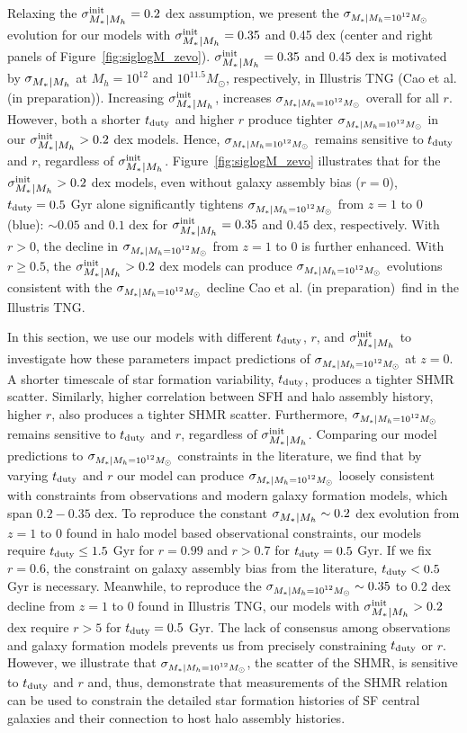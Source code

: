 \documentclass[12pt, letterpaper, preprint, tighten]{aastex62}
\newcommand{\cao}{Cao et al. (in preparation)}
\newcommand{\tduty}{t_{\rm duty}}
\newcommand{\siglogm}{\sigma_{\scaleto{M_*|M_h}{8pt}}}
\newcommand{\sigtwe}{\sigma_{\scaleto{M_*|M_h=10^{12}M_\odot}{8pt}}}
\begin{document}
Relaxing the $\siglogm^{\rm init} = 0.2$ dex assumption, we present the 
$\sigtwe$ evolution for our models with $\siglogm^{\rm init} = 0.35$
and 0.45 dex (center and right panels of Figure~\ref{fig:siglogM_zevo}).  
$\siglogm^{\rm init} = 0.35$ and 0.45 dex is motivated by $\siglogm$ at 
$M_h = 10^{12}$ and $10^{11.5}M_\odot$, respectively, in Illustris TNG (\cao). 
Increasing $\siglogm^{\rm init}$, increases $\sigtwe$ overall for all $r$. 
However, both a shorter $t_{\rm duty}$ and higher $r$ produce tighter 
$\sigtwe$ in our $\siglogm^{\rm init} > 0.2$ dex models. Hence, $\sigtwe$ 
remains sensitive to $t_{\rm duty}$ and $r$, regardless of $\siglogm^{\rm init}$. 
Figure~\ref{fig:siglogM_zevo} illustrates that for the $\siglogm^{\rm init}> 0.2$ dex 
models, even without galaxy assembly bias ($r=0$), $t_{\rm duty} = 0.5$ Gyr 
alone significantly tightens $\sigtwe$ from $z=1$ to 0 (blue): $\sim0.05$ and 
$0.1$ dex for $\siglogm^{\rm init} = 0.35$ and $0.45$ dex, respectively. With 
$r > 0$, the decline in $\sigtwe$ from $z=1$ to 0 is further enhanced. With 
$r \ge 0.5$, the $\siglogm^{\rm init}> 0.2$ dex models can produce $\sigtwe$ 
evolutions consistent with the $\sigtwe$ decline \cao~find in the Illustris 
TNG. 

In this section, we use our models with different $\tduty$, $r$, and 
$\siglogm^{\rm init}$ to investigate how these parameters impact predictions 
of $\sigtwe$ at $z=0$. A shorter timescale of star formation variability, 
$\tduty$, produces a tighter SHMR scatter. Similarly, higher correlation 
between SFH and halo assembly history, higher $r$, also produces a tighter 
SHMR scatter. Furthermore, $\sigtwe$ remains sensitive to $\tduty$ and $r$, 
regardless of $\siglogm^{\rm init}$. Comparing our model predictions to 
$\sigtwe$ constraints in the literature, we find that by varying $\tduty$ 
and $r$ our model can produce $\sigtwe$ loosely consistent with constraints 
from observations and modern galaxy formation models, which span $0.2 - 0.35$ dex. 
To reproduce the constant $\siglogm \sim 0.2$ dex evolution from $z=1$ to 0 
found in halo model based observational constraints, our models require 
$\tduty \leq 1.5$ Gyr for $r = 0.99$ and $r > 0.7$ for $\tduty = 0.5$ Gyr. 
If we fix $r = 0.6$, the constraint on galaxy assembly bias from the literature, 
$\tduty < 0.5$ Gyr is necessary. Meanwhile, to reproduce the 
$\sigtwe \sim 0.35$ to 0.2 dex decline from $z=1$ to 0 found in Illustris TNG, 
our models with $\siglogm^{\rm init} > 0.2$ dex require $r > 5$ for $\tduty = 0.5$ Gyr. 
The lack of consensus among observations and galaxy formation models prevents us 
from precisely constraining $\tduty$ or $r$. However, we illustrate that 
$\sigtwe$, the scatter of the SHMR, is sensitive to $\tduty$ and $r$ and, 
thus, demonstrate that measurements of the SHMR relation can be used to constrain 
the detailed star formation histories of SF central galaxies and their connection 
to host halo assembly histories.
\end{document}
